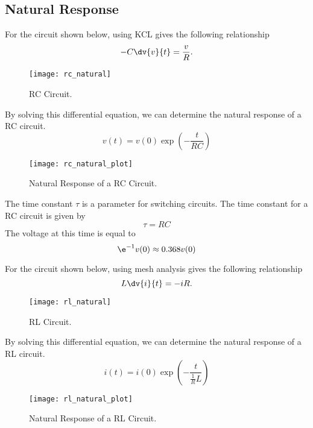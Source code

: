 \documentclass{article}
\begin{document}
\subsection{Natural Response}
\begin{definition}
    For the circuit shown below, using KCL gives the following relationship
    \begin{equation*}
        -C \dv{v}{t} = \frac{v}{R}.
    \end{equation*}
    \begin{figure}[H]
        \centering
        \texttt{[image: rc\_natural]}
        \caption{RC Circuit.}
    \end{figure}
    By solving this differential equation, we can determine the natural response of a
    RC circuit.
    \begin{equation*}
        v(t) = v(0)\exp{\left( -\frac{t}{RC} \right)}
    \end{equation*}
    \begin{figure}[H]
        \centering
        \texttt{[image: rc\_natural\_plot]}
        \caption{Natural Response of a RC Circuit.}
    \end{figure}
\end{definition}
\begin{definition}
    The time constant $\tau$ is a parameter for switching circuits. The time constant for a RC circuit is given by
    \begin{equation*}
        \tau = RC
    \end{equation*}
    The voltage at this time is equal to
    \begin{equation*}
        \e^{-1}v(0) \approx 0.368v(0)
    \end{equation*}
\end{definition}
\begin{definition}
    For the circuit shown below, using mesh analysis gives the following relationship
    \begin{equation*}
        L \dv{i}{t} = -iR.
    \end{equation*}
    \begin{figure}[H]
        \centering
        \texttt{[image: rl\_natural]}
        \caption{RL Circuit.}
    \end{figure}
    By solving this differential equation, we can determine the natural response of a
    RL circuit.
    \begin{equation*}
        i(t) = i(0)\exp{\left( -\frac{t}{\frac{1}{R}L} \right)}
    \end{equation*}
    \begin{figure}[H]
        \centering
        \texttt{[image: rl\_natural\_plot]}
        \caption{Natural Response of a RL Circuit.}
    \end{figure}
\end{definition}
\end{document}
